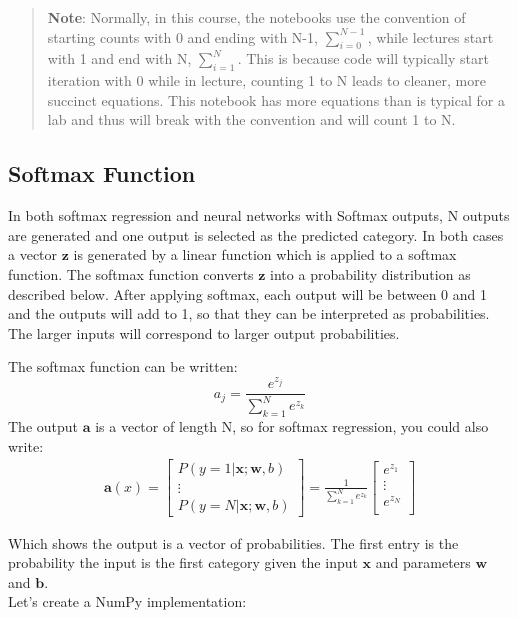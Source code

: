 \documentclass[11pt]{article}
\begin{document}
    \begin{quote}
\textbf{Note}: Normally, in this course, the notebooks use the
convention of starting counts with 0 and ending with N-1,
\(\sum_{i=0}^{N-1}\), while lectures start with 1 and end with N,
\(\sum_{i=1}^{N}\). This is because code will typically start iteration
with 0 while in lecture, counting 1 to N leads to cleaner, more succinct
equations. This notebook has more equations than is typical for a lab
and thus will break with the convention and will count 1 to N.
\end{quote}

    \hypertarget{softmax-function}{%
\subsection{Softmax Function}\label{softmax-function}}

In both softmax regression and neural networks with Softmax outputs, N
outputs are generated and one output is selected as the predicted
category. In both cases a vector \(\mathbf{z}\) is generated by a linear
function which is applied to a softmax function. The softmax function
converts \(\mathbf{z}\) into a probability distribution as described
below. After applying softmax, each output will be between 0 and 1 and
the outputs will add to 1, so that they can be interpreted as
probabilities. The larger inputs will correspond to larger output
probabilities.

    The softmax function can be written:
\[a_j = \frac{e^{z_j}}{ \sum_{k=1}^{N}{e^{z_k} }} \tag{1}\] The output
\(\mathbf{a}\) is a vector of length N, so for softmax regression, you
could also write: \begin{align}
\mathbf{a}(x) =
\begin{bmatrix}
P(y = 1 | \mathbf{x}; \mathbf{w},b) \\
\vdots \\
P(y = N | \mathbf{x}; \mathbf{w},b)
\end{bmatrix}
=
\frac{1}{ \sum_{k=1}^{N}{e^{z_k} }}
\begin{bmatrix}
e^{z_1} \\
\vdots \\
e^{z_{N}} \\
\end{bmatrix} \tag{2}
\end{align}

    Which shows the output is a vector of probabilities. The first entry is
the probability the input is the first category given the input
\(\mathbf{x}\) and parameters \(\mathbf{w}\) and \(\mathbf{b}\).\\
Let's create a NumPy implementation:
\end{document}
